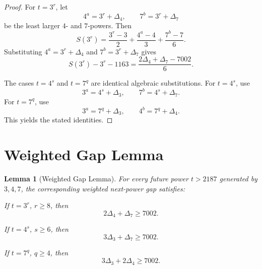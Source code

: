 \documentclass[11pt]{article}
\newtheorem{lemma}{Lemma}
\begin{document}
\begin{proof}
For \(t=3^r\), let
\[
4^a=3^r+\Delta_4,\qquad 7^b=3^r+\Delta_7
\]
be the least larger \(4\)- and \(7\)-powers. Then
\[
S(3^r)
=
\frac{3^r-3}{2}
+
\frac{4^a-4}{3}
+
\frac{7^b-7}{6}.
\]
Substituting \(4^a=3^r+\Delta_4\) and \(7^b=3^r+\Delta_7\) gives
\[
S(3^r)-3^r-1163
=
\frac{2\Delta_4+\Delta_7-7002}{6}.
\]

The cases \(t=4^s\) and \(t=7^q\) are identical algebraic substitutions. For \(t=4^s\), use
\[
3^a=4^s+\Delta_3,\qquad 7^b=4^s+\Delta_7.
\]
For \(t=7^q\), use
\[
3^a=7^q+\Delta_3,\qquad 4^b=7^q+\Delta_4.
\]
This yields the stated identities.
\end{proof}

\section{Weighted Gap Lemma}

\begin{lemma}[Weighted Gap Lemma]
For every future power \(t>2187\) generated by \(3,4,7\), the corresponding weighted next-power gap satisfies:

If \(t=3^r\), \(r\ge8\), then
\[
2\Delta_4+\Delta_7\ge7002.
\]

If \(t=4^s\), \(s\ge6\), then
\[
3\Delta_3+\Delta_7\ge7002.
\]

If \(t=7^q\), \(q\ge4\), then
\[
3\Delta_3+2\Delta_4\ge7002.
\]
\end{lemma}
\end{document}
